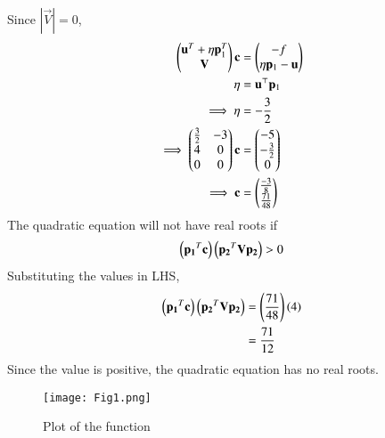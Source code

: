 \documentclass[journal,12pt,twocolumn]{IEEEtran}
\begin{document}
Since $|\vec{V}| = 0$,
\begin{align}
    \begin{pmatrix}\mathbf{u}^T+\eta \mathbf{p}_1^T \\ \mathbf{V}\end{pmatrix}\mathbf{c} &= \begin{pmatrix}-f \\ \eta \mathbf{p}_1-\mathbf{u}\end{pmatrix}\\
    \eta &= \mathbf{u}^\top \mathbf{p}_1\\
    \implies \eta &= -\frac{3}{2}\\
    \implies \begin{pmatrix}\frac{3}{2} & -3 \\ 4 & 0 \\ 0 & 0\end{pmatrix}\mathbf{c} &= \begin{pmatrix}-5 \\ -\frac{3}{2} \\ 0\end{pmatrix}\\
    \implies \mathbf{c} &= \begin{pmatrix}\frac{-3}{8}\\\frac{71}{48}\end{pmatrix}
\end{align}
The quadratic equation will not have real roots if
\begin{align}
    \left(\mathbf{p_1}^T\mathbf{c}\right)\left(\mathbf{p_2}^T\mathbf{V}\mathbf{p_2}\right) > 0
\end{align}
Substituting the values in LHS,
\begin{align}
    \left(\mathbf{p_1}^T\mathbf{c}\right)\left(\mathbf{p_2}^T\mathbf{V}\mathbf{p_2}\right) &= \left(\frac{71}{48}\right)\left(4\right)\\
    &= \frac{71}{12}
\end{align}
Since the value is positive, the quadratic equation has no real roots.
\begin{figure}[htp]
    \centering
    \texttt{[image: Fig1.png]}
    \caption{Plot of the function}
    \label{fig:plot}
\end{figure}
\end{document}
